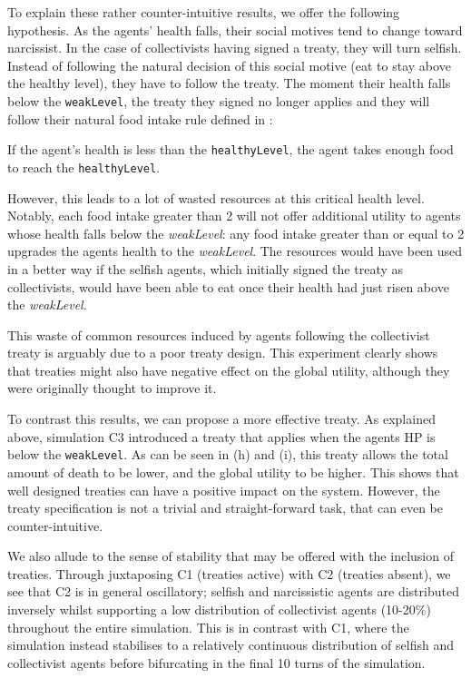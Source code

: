 To explain these rather counter-intuitive results, we offer the following hypothesis. As the agents' health falls, their social motives tend to change toward narcissist. In the case of collectivists having signed a treaty, they will turn selfish. Instead of following the natural decision of this social motive (eat to stay above the healthy level), they have to follow the treaty. The moment their health falls below the \texttt{weakLevel}, the treaty they signed no longer applies and they will follow their natural food intake rule defined in :

If the agent's health is less than the \texttt{healthyLevel}, the agent takes enough food to reach the \texttt{healthyLevel}.

However, this leads to a lot of wasted resources at this critical health level. Notably, each food intake greater than 2 will not offer additional utility to agents whose health falls below the \textit{weakLevel}: any food intake greater than or equal to 2 upgrades the agents health to the \textit{weakLevel}. The resources would have been used in a better way if the selfish agents, which initially signed the treaty as collectivists, would have been able to eat once their health had just risen above the \textit{weakLevel}.

This waste of common resources induced by agents following the collectivist treaty is arguably due to a poor treaty design. This experiment clearly shows that treaties might also have negative effect on the global utility, although they were originally thought to improve it.

To contrast this results, we can propose a more effective treaty. As explained above, simulation C3 introduced a treaty that applies when the agents HP is below the \texttt{weakLevel}. As can be seen in  (h) and (i), this treaty allows the total amount of death to be lower, and the global utility to be higher. This shows that well designed treaties can have a positive impact on the system. However, the treaty specification is not a trivial and straight-forward task, that can even be counter-intuitive.


We also allude to the sense of stability that may be offered with the inclusion of treaties. Through juxtaposing C1 (treaties active) with C2 (treaties absent), we see that C2 is in general oscillatory; selfish and narcissistic agents are distributed inversely whilst supporting a low distribution of collectivist agents (10-20\%) throughout the entire simulation. This is in contrast with C1, where the simulation instead stabilises to a relatively continuous distribution of selfish and collectivist agents before bifurcating in the final 10 turns of the simulation.


